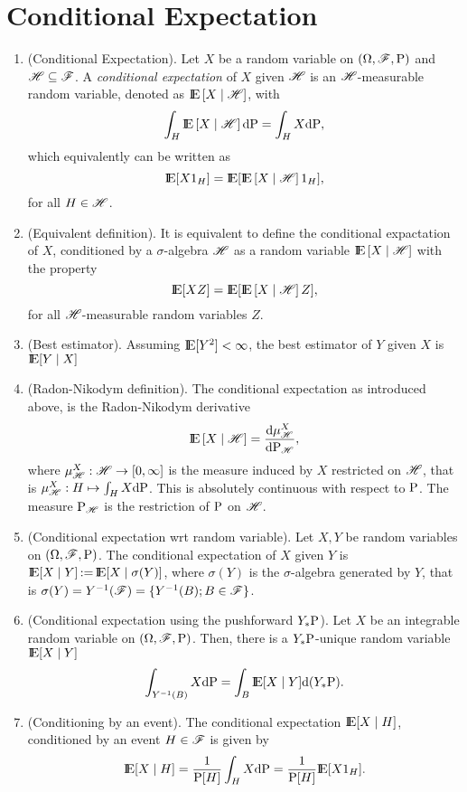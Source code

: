 \documentclass[a4paper,10pt]{article}
\newcommand{\ce}[1]{\E\left[#1 {}\mid{} \H \right]}
\begin{document}
\section{Conditional Expectation}
\begin{enumerate}
 \item (Conditional Expectation). Let $X$ be a random variable on $(\Omega,\mathscr{F},\mathrm{P})$ and $\mathscr{H}\subseteq \mathscr{F}$.
       A \textit{conditional expectation} of $X$ given $\mathscr{H}$ is an $\mathscr{H}$-measurable 
       random variable, denoted as $\ce{X}$, with
       \[
        \int_H \ce{X} \d\prob = \int_H X\d\prob,
       \]
       which equivalently can be written as
       \[
        \E[X 1_H] = \E[\ce{X}1_H],
       \]
       for all $H\in\mathscr{H}$.
 \item (Equivalent definition). It is equivalent to define the conditional expactation of $X$, 
       conditioned by a $\sigma$-algebra $\mathscr{H}$ as a random variable $\ce{X}$ with the property
       \[
        \E[X Z] = \E[\ce{X}Z],
       \]
       for all $\mathscr{H}$-measurable random variables $Z$.
 \item (Best estimator). Assuming $\E[Y^2]<\infty$, the best estimator of $Y$ given $X$ is $\E[Y{}\mid{}X]$      
 \item (Radon-Nikodym definition). The conditional expectation as introduced above, is the Radon-Nikodym
       derivative
       \[
          \ce{X} = \frac{\d \mu^X_{\H}}{\d \prob_{\H}},
       \]
      where $\mu^X_{\mathscr{H}}:\mathscr{H}\to [0,\infty]$ is the measure induced by $X$
      restricted on $\mathscr{H}$, that is $\mu^X_{\mathscr{H}}:H\mapsto \int_H X\mathrm{d}\mathrm{P}$.
      This is absolutely continuous with respect to $\mathrm{P}$. The measure $\mathrm{P}_{\mathscr{H}}$
      is the restriction of $\mathrm{P}$ on $\mathscr{H}$. 
      
 \item (Conditional expectation wrt random variable). Let $X,Y$ be random variables on $(\Omega,\mathscr{F},\mathrm{P})$.
       The conditional expectation of $X$ given $Y$ is $\E[X\mid Y]\dfn \E[X\mid \sigma(Y)]$,
       where $\sigma(Y)$ is the $\sigma$-algebra generated by $Y$, that is 
       $\sigma(Y) = Y^{-1}(\mathscr{F}) = \{Y^{-1}(B); B\in\mathscr{F}\}$.
       
 \item (Conditional expectation using the pushforward $Y_*\mathrm{P}$). 
       Let $X$ be an integrable random variable on $(\Omega,\mathscr{F},\mathrm{P})$. Then, there is a $Y_*\mathrm{P}$-unique 
       random variable $\E[X\mid Y]$
       \[
        \int_{Y^{-1}(B)} X\d \prob = \int_B \E[X{}\mid{}Y]\d(Y_*\prob).
       \]

 \item (Conditioning by an event). The conditional expectation $\E[X\mid H]$, conditioned
       by an event $H\in\mathscr{F}$ is given by
       \[
        \E[X\mid H] = \frac{1}{\prob[H]}\int_H X\d\prob = \frac{1}{\prob[H]}\E[X1_H].
       \]


\end{enumerate}
\end{document}
